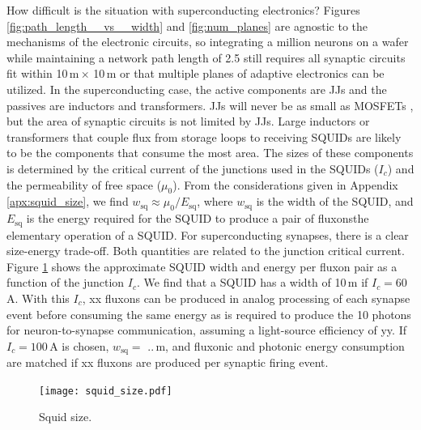 \documentclass[twocolumn]{article}
\begin{document}
How difficult is the situation with superconducting electronics? Figures \ref{fig:path_length__vs__width} and \ref{fig:num_planes} are agnostic to the mechanisms of the electronic circuits, so integrating a million neurons on a wafer while maintaining a network path length of 2.5 still requires all synaptic circuits fit within 10\,\textmu m\,$\times$ 10\,\textmu m or that multiple planes of adaptive electronics can be utilized. In the superconducting case, the active components are JJs and the passives are inductors and transformers. JJs will never be as small as MOSFETs \cite{tolpygo2016superconductor}, but the area of synaptic circuits is not limited by JJs. Large inductors or transformers that couple flux from storage loops to receiving SQUIDs are likely to be the components that consume the most area. The sizes of these components is determined by the critical current of the junctions used in the SQUIDs ($I_c$) and the permeability of free space ($\mu_0$). From the considerations given in Appendix \ref{apx:squid_size}, we find $w_{\mathrm{sq}} \approx \mu_0/E_{\mathrm{sq}}$, where $w_{\mathrm{sq}}$ is the width of the SQUID, and $E_{\mathrm{sq}}$ is the energy required for the SQUID to produce a pair of fluxons\textemdash the elementary operation of a SQUID. For superconducting synapses, there is a clear size-energy trade-off. Both quantities are related to the junction critical current. Figure \ref{fig:squid_size} shows the approximate SQUID width and energy per fluxon pair as a function of the junction $I_c$. We find that a SQUID has a width of 10\,\textmu m if $I_c = 60$\,\textmu A. With this $I_c$, xx fluxons can be produced in analog processing of each synapse event before consuming the same energy as is required to produce the 10 photons for neuron-to-synapse communication, assuming a light-source efficiency of yy. If $I_c = 100$\,\textmu A is chosen, $w_{\mathrm{sq}} = $ ..\,\textmu m, and fluxonic and photonic energy consumption are matched if xx fluxons are produced per synaptic firing event.
\begin{figure}
    \centering
    \texttt{[image: squid\_size.pdf]}
    \caption{Squid size.}
    \label{fig:squid_size}
\end{figure}
\end{document}
